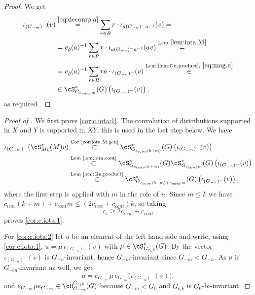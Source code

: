 \documentclass[12pt,a4paper]{amsart}%
\newcommand{\RamiA}[1]{{{#1}}}
\begin{document}
\begin{proof}

\RamiA{
We get
\begin{align*}
\iota_{(G_{-m})^-}(v)
&\overset{\eqref{eq:decomp.a}}{=}
\sum_{r\in R} r\cdot \iota_{a(G_{-n})^-a^{-1}}(v)=\\
&=c_\rho(a)^{-1}\sum_{r\in R} r\cdot\iota_{a{(G_{-n})^-}a^{-1}}(av)
\overset{\text{Lem }\ref{lem:iota.M}}{=}
\\
&=
c_\rho(a)^{-1}\sum_{r\in R} r a\cdot \iota_{{(G_{-n})^-}}(v)
\overset{\text{Lem~\ref{lem:Gn.product}},\ \eqref{eq:mag.a}}{\in}
\\
&
\in
\cS^*_{G_{c_{cont}m}}(G)\left(\iota_{(G_{-n})^-}(v)\right),
\end{align*}
as required.
}
\end{proof}

\begin{proof}[Proof of ]
We first prove \eqref{cor:c.iota:1}. The convolution of distributions supported in $X$ and $Y$ is supported in
$XY$; this is used in the last step below. We have
\begin{align*}
\iota_{(G_{-m})^-}(\cS^*_{M_k}(M)v)
&\overset{\text{Cor~\ref{cor:iota.M.gen}}}{\subset}
\cS^*_{G_{c_{\iota cov}(k+m)}}(G)
\left(\iota_{(G_{-m})^-}(v)\right)\\
&\overset{\text{Lem~\ref{lem:iota.cont}}}{\subset}
\cS^*_{G_{c_{\iota cov}(k+m)}}(G)
\cS^*_{G_{c_{cont}m}}(G)
\left(\iota_{(G_{-n})^-}(v)\right)\\
&\overset{\text{Lem~\ref{lem:Gn.product}}}{\subset}
\cS^*_{G_{c_{\iota cov}(k+m)+c_{cont}m}}(G)
\left(\iota_{(G_{-n})^-}(v)\right),
\end{align*}
where the first step is applied with $m$ in the role of $n$. Since $m\leq k$ we have
$c_{\iota cov}(k+m)+c_{cont}m\leq (2c_{\iota cov}+c_{cont})k$, so taking
$$
c_{\iota}\geq 2c_{\iota cov}+c_{cont}
$$
proves \eqref{cor:c.iota:1}.

For \eqref{cor:c.iota:2} let $u$ be an element of the left hand side and write, using
\eqref{cor:c.iota:1}, $u=\mu\,\iota_{(G_{-n})^-}(v)$ with $\mu\in \cS^*_{G_{c_\iota k}}(G)$. By
 the vector $\iota_{(G_{-n})^-}(v)$ is $G_{-n}$-invariant, hence
$G_{-m}$-invariant since $G_{-m}<G_{-n}$. As $u$ is $G_{-m}$-invariant as well, we get
$$
u=e_{G_{-m}}\,\mu\, e_{G_{-m}}\bigl(\iota_{(G_{-n})^-}(v)\bigr),
$$
and $e_{G_{-m}}\mu e_{G_{-m}}\in \cH_{G_{-m}}^{G_{c_\iota k}}(G)$ because $G_{-m}<G_0$ and
$G_{c_\iota k}$ is $G_0$-bi-invariant.
\end{proof}
\end{document}
